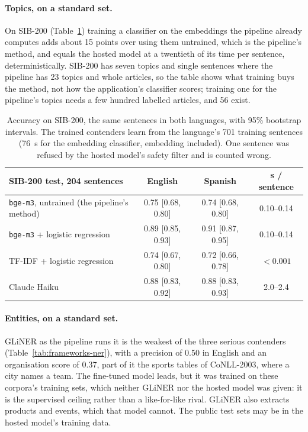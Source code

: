 \paragraph{Topics, on a standard set.} On SIB-200
(Table~\ref{tab:frameworks-sib}) training a classifier on the embeddings
the pipeline already computes adds about 15 points over using them
untrained, which is the pipeline's method, and equals the hosted model
at a twentieth of its time per sentence, deterministically. SIB-200 has
seven topics and single sentences where the pipeline has 23 topics and
whole articles, so the table shows what training buys the method, not
how the application's classifier scores; training one for the
pipeline's topics needs a few hundred labelled articles, and 56 exist.

\begin{table}[ht]
\centering
\small
\begin{tabular}{@{}lccc@{}}
\toprule
SIB-200 test, 204 sentences & English & Spanish & s / sentence \\
\midrule
\texttt{bge-m3}, untrained (the pipeline's method) & 0.75 [0.68, 0.80] & 0.74 [0.68, 0.80] & 0.10--0.14 \\
\texttt{bge-m3} + logistic regression & 0.89 [0.85, 0.93] & 0.91 [0.87, 0.95] & 0.10--0.14 \\
TF-IDF + logistic regression & 0.74 [0.67, 0.80] & 0.72 [0.66, 0.78] & $<0.001$ \\
Claude Haiku & 0.88 [0.83, 0.92] & 0.88 [0.83, 0.93] & 2.0--2.4 \\
\bottomrule
\end{tabular}
\caption[Topic classification on SIB-200]{Accuracy on SIB-200, the same
sentences in both languages, with 95\% bootstrap intervals. The trained
contenders learn from the language's 701 training sentences (76~s for
the embedding classifier, embedding included). One sentence was refused
by the hosted model's safety filter and is counted wrong.}
\label{tab:frameworks-sib}
\end{table}

\paragraph{Entities, on a standard set.} GLiNER as the pipeline runs it
is the weakest of the three serious contenders
(Table~\ref{tab:frameworks-ner}), with a precision of 0.50 in English
and an organisation score of 0.37, part of it the sports tables of
CoNLL-2003, where a city names a team. The fine-tuned model leads, but
it was trained on these corpora's training sets, which neither GLiNER
nor the hosted model was given: it is the supervised ceiling rather than
a like-for-like rival. GLiNER also extracts products and events, which
that model cannot. The public test sets may be in the hosted model's
training data.

